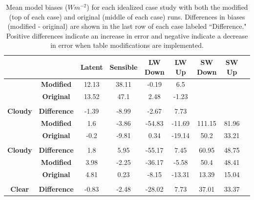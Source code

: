 \begin{table}[b!]
\centering
\footnotesize
\doublespacing
{
\begin{tabular}{| c | c | c | c | c | c | c | c | c |}
\hline
\rowcolor[HTML]{F3F3F3} & & \textbf{Latent} & \textbf{Sensible} & \textbf{LW Down} & \textbf{LW Up} & \textbf{SW Down} & \textbf{SW Up} \\
\hline 
\cellcolor[HTML]{F3F3F3} & \cellcolor[HTML]{F3F3F3} \textbf{Modified} & 12.13 & 	38.11	& -0.19	& 6.5 & & \\
\cellcolor[HTML]{F3F3F3}& \cellcolor[HTML]{F3F3F3} \textbf{Original} & 13.52 &	47.1	& 2.48	& -1.23 & & \\
\cellcolor[HTML]{F3F3F3}\multirow{-3}{*}{\shortstack{\textbf{Winter} \\ \textbf{Cloudy}}} & \cellcolor[HTML]{F3F3F3} \textbf{Difference} & -1.39 &	-8.99 &	-2.67 &	7.73 & & \\
\hline
\cellcolor[HTML]{F3F3F3} & \cellcolor[HTML]{F3F3F3} \textbf{Modified} & 1.6 &	-3.86 &	-54.83	& -11.69 &	111.15 &	81.96 \\
\cellcolor[HTML]{F3F3F3} & \cellcolor[HTML]{F3F3F3} \textbf{Original} & -0.2 &	-9.81 &	0.34 &	-19.14 &	50.2 &	33.21 \\
\cellcolor[HTML]{F3F3F3} \multirow{-3}{*}{\shortstack{\textbf{Spring} \\ \textbf{Cloudy}}} & \cellcolor[HTML]{F3F3F3} \textbf{Difference} & 1.8 &	5.95 &	-55.17	& 7.45	& 60.95 &	48.75 \\
\hline
\cellcolor[HTML]{F3F3F3} & \cellcolor[HTML]{F3F3F3} \textbf{Modified} & 3.98	& -2.25 &	-36.17 &	-5.58 &	50.4 &	48.41 \\
\cellcolor[HTML]{F3F3F3} & \cellcolor[HTML]{F3F3F3} \textbf{Original} & 4.81	& 0.23	& -8.15 & 	-13.31	& 13.39	& 15.04 \\
\cellcolor[HTML]{F3F3F3} \multirow{-3}{*}{\shortstack{\textbf{Spring} \\ \textbf{Clear}}} & \cellcolor[HTML]{F3F3F3} \textbf{Difference} \cellcolor[HTML]{F3F3F3} & -0.83 &	-2.48	& -28.02	& 7.73 &	37.01	& 33.37 \\
\hline
\end{tabular}}
\caption[Mean model bias for idealized WRF runs with modified LANDUSE.TBL values.]{Mean model biases ($Wm^{-2}$) for each idealized case study with both the modified (top of each case) and original (middle of each case) runs. Differences in biases (modified - original) are shown in the last row of each case labeled ``Difference." Positive differences indicate an increase in error and negative indicate a decrease in error when table modifications are implemented.}
\label{tab:wrf:meanbias}
\end{table}

